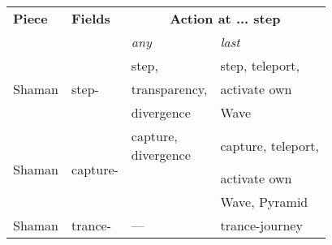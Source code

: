 \clearpage %

\begin{table}[!h]
\centering
\begin{tabular}{ llll }
\toprule %
\textbf{Piece}              & \textbf{Fields}           & \multicolumn{2}{c}{ \textbf{Action at ... step} }         \\
                                                        \cmidrule{3-4} %
                            &                           & \emph{any}\footnotemark[1]    & \emph{last}               \\
\midrule %
\multirow{3}{*}{Shaman}     & \multirow{3}{*}{step-\footnotemark[2]}
                                                        & step,                         & step, teleport,           \\
                            &                           & transparency,                 & activate own              \\
                            &                           & divergence                    & Wave                      \\
\cmidrule{1-4} %
\multirow{3}{*}{Shaman}     & \multirow{3}{*}{capture-} & \parbox[b][1pt][s]{10ex}{capture,\\divergence}
                                                                                        & capture, teleport,        \\
                            &                           &                               & activate own              \\
                            &                           &                               & Wave, Pyramid             \\
Shaman                      & trance-                   & ---                           & trance-journey            \\

\end{tabular}
\end{table}
